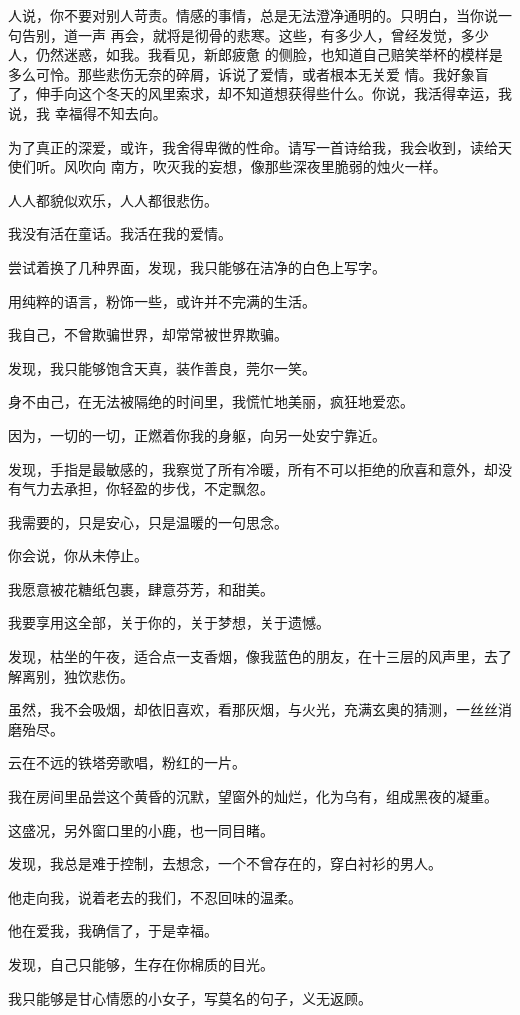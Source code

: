 		人说，你不要对别人苛责。情感的事情，总是无法澄净通明的。只明白，当你说一句告别，道一声
	再会，就将是彻骨的悲寒。这些，有多少人，曾经发觉，多少人，仍然迷惑，如我。我看见，新郎疲惫
	的侧脸，也知道自己赔笑举杯的模样是多么可怜。那些悲伤无奈的碎屑，诉说了爱情，或者根本无关爱
	情。我好象盲了，伸手向这个冬天的风里索求，却不知道想获得些什么。你说，我活得幸运，我说，我
	幸福得不知去向。


		为了真正的深爱，或许，我舍得卑微的性命。请写一首诗给我，我会收到，读给天使们听。风吹向
	南方，吹灭我的妄想，像那些深夜里脆弱的烛火一样。


		人人都貌似欢乐，人人都很悲伤。

		我没有活在童话。我活在我的爱情。

	\endwriting



		尝试着换了几种界面，发现，我只能够在洁净的白色上写字。\par
		用纯粹的语言，粉饰一些，或许并不完满的生活。\par
		我自己，不曾欺骗世界，却常常被世界欺骗。\par
		发现，我只能够饱含天真，装作善良，莞尔一笑。\par
		身不由己，在无法被隔绝的时间里，我慌忙地美丽，疯狂地爱恋。\par
		因为，一切的一切，正燃着你我的身躯，向另一处安宁靠近。\par
		发现，手指是最敏感的，我察觉了所有冷暖，所有不可以拒绝的欣喜和意外，却没有气力去承担，你轻盈的步伐，不定飘忽。\par
		我需要的，只是安心，只是温暖的一句思念。\par
		你会说，你从未停止。\par
		我愿意被花糖纸包裹，肆意芬芳，和甜美。\par
		我要享用这全部，关于你的，关于梦想，关于遗憾。\par
		发现，枯坐的午夜，适合点一支香烟，像我蓝色的朋友，在十三层的风声里，去了解离别，独饮悲伤。\par
		虽然，我不会吸烟，却依旧喜欢，看那灰烟，与火光，充满玄奥的猜测，一丝丝消磨殆尽。\par
		云在不远的铁塔旁歌唱，粉红的一片。\par
		我在房间里品尝这个黄昏的沉默，望窗外的灿烂，化为乌有，组成黑夜的凝重。\par
		这盛况，另外窗口里的小鹿，也一同目睹。\par
		发现，我总是难于控制，去想念，一个不曾存在的，穿白衬衫的男人。\par
		他走向我，说着老去的我们，不忍回味的温柔。\par
		他在爱我，我确信了，于是幸福。\par
		发现，自己只能够，生存在你棉质的目光。\par
		我只能够是甘心情愿的小女子，写莫名的句子，义无返顾。

